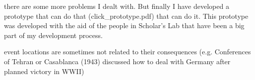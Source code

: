 there are some more problems I dealt with. But finally I have developed a prototype that can do that (click\_prototype.pdf) that can do it. This prototype was developed with the aid of the people in Scholar's Lab that have been a big part of my development process.

event locations are sometimes not related to their consequences (e.g. Conferences of Tehran or Casablanca (1943) discussed how to deal with Germany after planned victory in WWII)

